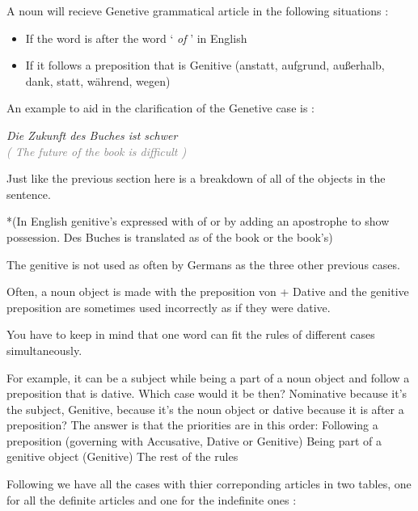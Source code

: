 \documentclass[a4paper,twocolumn,10pt]{article}
\newcommand{\newpar}
{\par \vspace{0.3cm}}
\begin{document}
\vspace{0.5cm}

\linenumbers


A noun will recieve Genetive grammatical article in the following situations
:\newpar 
\nolinenumbers
\begin{itemize}[noitemsep]

	\item     If the word is after the word ` \textit{of} ' in English

	\item If it follows a preposition that is Genitive (anstatt, aufgrund,
	außerhalb, dank, statt, während, wegen)

\end{itemize}
\linenumbers

An example to aid in the clarification of the Genetive case is :\newpar


\noindent
\textit{Die Zukunft des Buches ist schwer}\\
\textcolor{gray} { \textit{( The future of the book is difficult )} } \newpar

Just like the previous section here is a breakdown of all of the objects in the
sentence.


*(In English genitive’s expressed with of or by adding an apostrophe to show
possession. Des Buches is translated as of the book or the book’s)

The genitive is not used as often by Germans as the three
other previous cases.


Often, a noun object is made with the preposition von +
Dative and the genitive preposition are sometimes used incorrectly as if they
were dative.


You have to keep in mind that one word can fit the rules of different cases
simultaneously.


For example, it can be a subject while being a
part of a noun object and follow a preposition that is dative. Which case would
it be then?  Nominative because it’s the subject, Genitive, because it’s the
noun object or dative because it is after a preposition?  The answer is that the
priorities are in this order: Following a preposition (governing with
Accusative, Dative or Genitive) Being part of a genitive object (Genitive) The
rest of the rules


Following we have all the cases with thier correponding articles in two tables,
one for all the definite articles and one for the indefinite ones :\newpar
\end{document}
